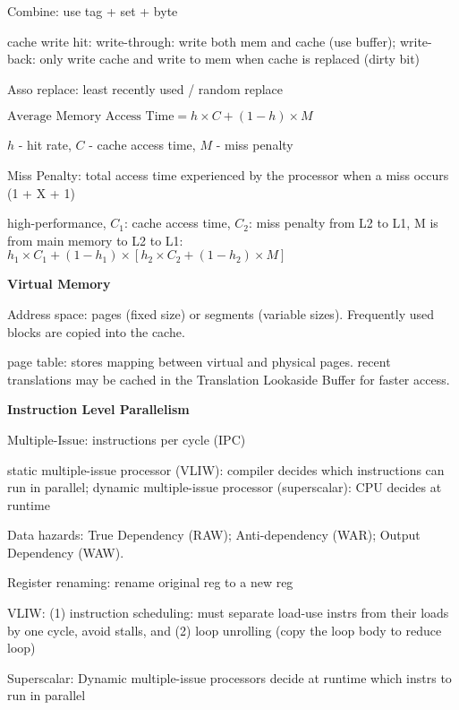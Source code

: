 \documentclass[10pt,landscape,a4paper]{article}
\begin{document}
\begin{multicols}{3}
Combine: use tag + set + byte

cache write hit: write-through: write both mem and cache (use buffer); write-back: only write cache and write to mem when cache is replaced (dirty bit)

Asso replace: least recently used / random replace

\(\text{Average Memory Access Time} = h \times C + (1 - h) \times M\)

\(h\) - hit rate, \(C\) - cache access time, \(M\) - miss penalty

Miss Penalty: total access time experienced by the processor when a miss occurs (1 + X + 1)

high-performance, \(C_1\): cache access time, \(C_2\): miss penalty from L2 to L1, M is from main memory to L2 to
L1: \( h_1 \times C_1 + (1 - h_1) \times \left[h_2 \times C_2 + (1 - h_2) \times M \right] \)

\textbf{Virtual Memory} 

Address space: pages (fixed size) or segments (variable sizes). Frequently used blocks are copied into the cache.

page table: stores mapping between virtual and physical pages. recent translations may be cached in the Translation Lookaside Buffer for faster access.

\textbf{Instruction Level Parallelism}

Multiple-Issue: instructions per cycle (IPC)

static multiple-issue processor (VLIW): compiler decides which instructions can run in parallel; dynamic multiple-issue processor (superscalar): CPU decides at runtime

Data hazards: True Dependency (RAW); Anti-dependency (WAR); Output Dependency (WAW).

Register renaming: rename original reg to a new reg

VLIW: (1) instruction scheduling: must separate load-use instrs from their loads by one cycle, avoid stalls, and (2) loop unrolling (copy the loop body to reduce loop)

Superscalar: Dynamic multiple-issue processors decide at runtime which instrs to run in parallel
\vfill\break
\end{multicols}
\end{document}
